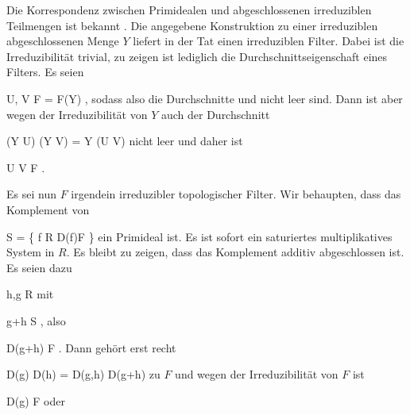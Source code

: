 {





Die Korrespondenz zwischen Primidealen und abgeschlossenen irreduziblen Teilmengen
 {} {}
ist bekannt
 {} {.}
Die angegebene Konstruktion zu einer irreduziblen abgeschlossenen Menge $Y$ liefert in der Tat einen irreduziblen Filter. Dabei ist die Irreduzibilität trivial, zu zeigen ist lediglich die Durchschnittseigenschaft eines Filters. Es seien

\mavergleichskette
{\vergleichskette
{ U, V
}
{ \in }{ F
}
{ = }{ F(Y)
}
{    }{
}
{   }{
}
}
{}{}{,}
sodass also
die Durchschnitte
 und
 nicht leer sind. Dann ist aber wegen der Irreduzibilität von $Y$ auch der Durchschnitt

\mavergleichskettedisp
{\vergleichskette
{ (Y \cap U) \cap (Y \cap V)
}
{ =} { Y \cap (U \cap V)
}
{ } {
}
{ } {
}
{ } {
}
}
{}{}{}
nicht leer und daher ist

\mavergleichskette
{\vergleichskette
{ U \cap V
}
{ \in }{ F
}
{  }{
}
{    }{
}
{   }{
}
}
{}{}{.}

Es sei nun $F$ irgendein irreduzibler topologischer Filter. Wir behaupten, dass das Komplement von

\mavergleichskettedisp
{\vergleichskette
{S
}
{ =} { \left\{  f \in R   \mid   D(f)\in F        \right\}
}
{ } {
}
{ } {
}
{ } {
}
}
{}{}{}
ein Primideal ist. Es ist sofort ein saturiertes multiplikatives System in $R$. Es bleibt zu zeigen, dass das Komplement additiv abgeschlossen ist. Es seien dazu

\mavergleichskette
{\vergleichskette
{ h,g
}
{ \in }{ R
}
{  }{
}
{    }{
}
{   }{
}
}
{}{}{}
mit

\mavergleichskette
{\vergleichskette
{ g+h
}
{ \in }{ S
}
{  }{
}
{    }{
}
{   }{
}
}
{}{}{,}
also

\mavergleichskette
{\vergleichskette
{ D(g+h)
}
{ \in }{ F
}
{  }{
}
{    }{
}
{   }{
}
}
{}{}{.}
Dann gehört erst recht

\mavergleichskettedisp
{\vergleichskette
{ D(g) \cup D(h)
}
{ =} { D(g,h)
}
{ \supseteq} { D(g+h)
}
{ } {
}
{ } {
}
}
{}{}{}
zu $F$ und wegen der Irreduzibilität von $F$ ist

\mavergleichskette
{\vergleichskette
{ D(g)
}
{ \in }{ F
}
{  }{
}
{    }{
}
{   }{
}
}
{}{}{}
oder

}
